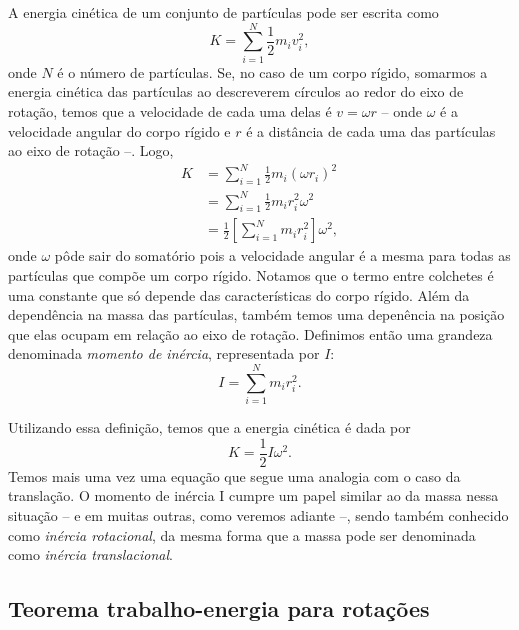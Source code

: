 A energia cinética de um conjunto de partículas pode ser escrita como
\begin{equation}
	K = \sum_{i=1}^N \frac{1}{2} m_i v_i^2,
\end{equation}
%
onde $N$ é o número de partículas. Se, no caso de um corpo rígido, somarmos a energia cinética das partículas ao descreverem círculos ao redor do eixo de rotação, temos que a velocidade de cada uma delas é $v = \omega r$ -- onde $\omega$ é a velocidade angular do corpo rígido e $r$ é a distância de cada uma das partículas ao eixo de rotação --. Logo,
\begin{align}
	K &= \sum_{i=1}^{N} \frac{1}{2} m_i (\omega r_i)^2 \\
	&= \sum_{i=1}^N \frac{1}{2} m_i r_i^2 \omega^2 \\
	&= \frac{1}{2} \left[\sum_{i=1}^N m_i r_i^2\right] \omega^2,
\end{align}
%
onde $\omega$ pôde sair do somatório pois a velocidade angular é a mesma para todas as partículas que compõe um corpo rígido. Notamos que o termo entre colchetes é uma constante que só depende das características do corpo rígido. Além da dependência na massa das partículas, também temos uma depenência na posição que elas ocupam em relação ao eixo de rotação. Definimos então uma grandeza denominada \emph{momento de inércia}, representada por $I$:
\begin{equation}\label{Eq:DefMomentoDeInercia}
	I = \sum_{i=1}^N m_i r_i^2.
\end{equation}

Utilizando essa definição, temos que a energia cinética é dada por
\begin{equation}
	K = \frac{1}{2} I \omega^2.
\end{equation}
%
Temos mais uma vez uma equação que segue uma analogia com o caso da translação. O momento de inércia I cumpre um papel similar ao da massa nessa situação -- e em muitas outras, como veremos adiante --, sendo também conhecido como \emph{inércia rotacional}, da mesma forma que a massa pode ser denominada como \emph{inércia translacional}.


\subsection{Teorema trabalho-energia para rotações}

